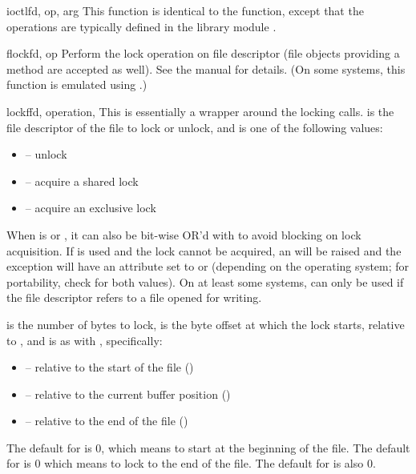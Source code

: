\begin{funcdesc}{ioctl}{fd, op, arg}
  This function is identical to the  function, except
  that the operations are typically defined in the library module
  .
\end{funcdesc}

\begin{funcdesc}{flock}{fd, op}
Perform the lock operation  on file descriptor  (file
  objects providing a  method are accepted as well).
See the \UNIX{} manual  for details.  (On some
systems, this function is emulated using .)
\end{funcdesc}

\begin{funcdesc}{lockf}{fd, operation,
    }
This is essentially a wrapper around the  locking
calls.   is the file descriptor of the file to lock or unlock,
and  is one of the following values:

\begin{itemize}
\item {} -- unlock
\item {} -- acquire a shared lock
\item {} -- acquire an exclusive lock
\end{itemize}

When  is  or , it
can also be bit-wise OR'd with  to avoid blocking on
lock acquisition.  If  is used and the lock cannot
be acquired, an  will be raised and the exception
will have an  attribute set to  or
 (depending on the operating system; for portability,
check for both values).  On at least some systems, 
can only be used if the file descriptor refers to a file opened for
writing.

 is the number of bytes to lock,  is the byte
offset at which the lock starts, relative to , and
 is as with , specifically:

\begin{itemize}
\item {} -- relative to the start of the file
      ()
\item {} -- relative to the current buffer position
      ()
\item {} -- relative to the end of the file
      ()
\end{itemize}

The default for  is 0, which means to start at the
beginning of the file.  The default for  is 0 which means
to lock to the end of the file.  The default for  is also
0.
\end{funcdesc}

